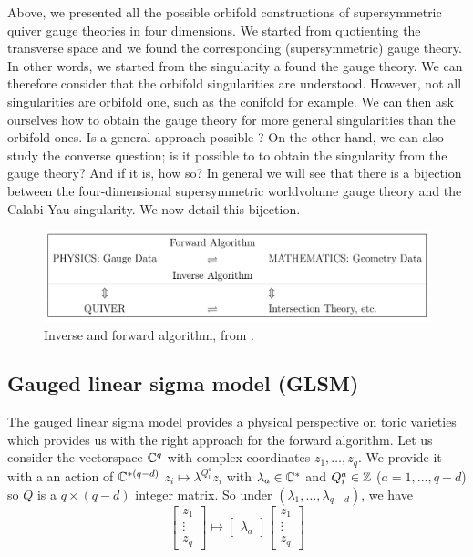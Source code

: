     Above, we presented all the possible orbifold constructions of supersymmetric quiver gauge theories in four dimensions. We started from quotienting the transverse space and we found the corresponding (supersymmetric) gauge theory. In other words, we started from the singularity a found the gauge theory. We can therefore consider that the orbifold singularities are understood. However, not all singularities are orbifold one, such as the conifold for example. We can then ask ourselves how to obtain the gauge theory for more general singularities than the orbifold ones. Is a general approach possible ? On the other hand, we can also study the converse question; is it possible to to obtain the singularity from the gauge theory? And if it is, how so? In general we will see that there is a bijection between the four-dimensional supersymmetric worldvolume gauge theory and the Calabi-Yau singularity. We now detail this bijection.

    \begin{figure}[H]
        \centering
        \includegraphics[scale=0.3]{Pictures/algorithm.png}
        \caption{Inverse and forward algorithm, from \cite{he2004lectures}.}
    \end{figure}

    \subsection{Gauged linear sigma model (GLSM)}

        The gauged linear sigma model provides a physical perspective on toric varieties which provides us with the right approach for the forward algorithm. Let us consider the vectorspace $\mathbb{C}^q$ with complex coordinates $z_1,\dots,z_q$. We provide it with a an action of $\mathbb{C}^{*(q-d)}$ $z_i\mapsto\lambda^{Q^a_i}z_i$ with $\lambda_a\in\mathbb{C}^*$ and $Q^a_i\in\mathbb{Z}$ ($a=1,\dots,q-d$) so $Q$ is a $q\times(q-d)$ integer matrix. So under $(\lambda_1,\dots,\lambda_{q-d})$, we have
        \begin{equation}
            \begin{bmatrix}
                z_1\\
                \vdots\\
                z_q
            \end{bmatrix}
            \mapsto
            \begin{bmatrix}
                \lambda_a
            \end{bmatrix}
            \begin{bmatrix}
                z_1\\
                \vdots\\
                z_q
            \end{bmatrix}
        \end{equation}

